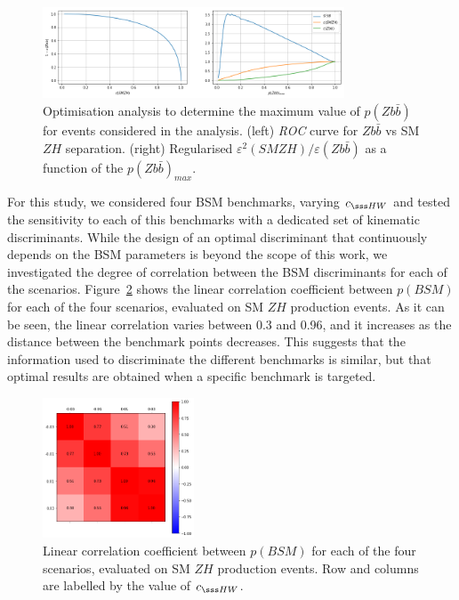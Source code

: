 \begin{figure}
\centering
\includegraphics[width=0.8\textwidth]{plots/bkg_cut_opt.png}
\caption{
\label{fig:s2_over_b}
Optimisation analysis to determine the maximum value of $p(Z b\bar{b})$ for events
considered in the analysis. (left) {\it ROC} curve for $Z b\bar{b}$ vs SM $Z H$
separation. (right) Regularised $\varepsilon^2(SM Z H) /
\varepsilon(Zb\bar{b})$ as a function of the $p(Z b\bar{b})_{max}$.
}
\end{figure}

For this study, we considered four BSM benchmarks, varying $c_{\sss HW}$ and tested the
sensitivity to each of this benchmarks with a dedicated set of kinematic
discriminants. While the design of an optimal discriminant that continuously depends on
the BSM parameters is beyond the scope of this work, we investigated the degree of
correlation between the BSM discriminants for each of the scenarios.
Figure~\ref{fig:bdt_corr} shows the linear correlation coefficient between $p(BSM)$ for
each of the four scenarios, evaluated on SM $Z H$ production events. As it can be seen,
the linear correlation varies between 0.3 and 0.96, and it increases as the distance
between the benchmark points decreases. This suggests that the information used to
discriminate the different benchmarks is similar, but that optimal results are obtained
when a specific benchmark is targeted.

\begin{figure}
\centering
\includegraphics[width=0.4\textwidth]{plots/bdt_corr.png}
\caption{
\label{fig:bdt_corr}
Linear correlation coefficient between $p(BSM)$ for
each of the four scenarios, evaluated on SM $Z H$ production events.
Row and columns are labelled by the value of $c_{\sss HW}$.
}
\end{figure}

